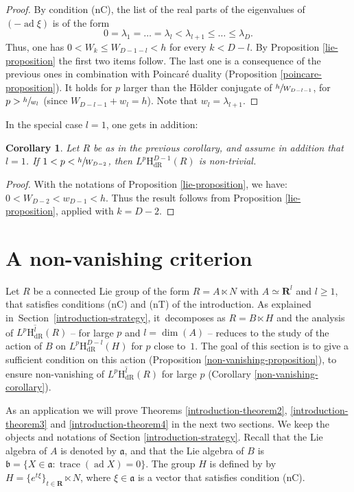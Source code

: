 \documentclass[JEP,XML,SOM,Unicode,published]{cedram}
\newcommand{\dR}{\mathrm{dR}}
\newcommand{\rH}{\mathrm{H}}
\newcommand{\fra}{\mathfrak{a}}
\newcommand{\frb}{\mathfrak{b}}
\newcommand{\RR}{\mathbf{R}}
\theoremstyle{plain}
\newtheorem{corollary}[equation]{Corollary}
\theoremstyle{remark}
\theoremstyle{definition}
\DeclareMathOperator{\ad}{ad}
\DeclareMathOperator{\trace}{trace}
\begin{document}
\begin{proof} By condition (nC), the list of the real parts of the eigenvalues of $(-\ad\xi)$ is of the form
\[0=\lambda_1 = \dots = \lambda_l < \lambda_{l+1} \leqslant \dots \leqslant \lambda_D.\]
Thus, one has $0< W_k \leqslant W_{D-1-l} <h$ for every $k <D-l$.
By Proposition \ref{lie-proposition} the first two items follow. The last one is a consequence of the previous ones in combination with Poincaré duality (Proposition \ref{poincare-proposition}). It holds
for $p$ larger than the Hölder conjugate of
$\sfrac{h}{W_{D-l-1}}$, \ie for $p> \sfrac{h}{w_{l}}$
(since $W_{D-l-1} + w_{l}=h$). Note that $w_l = \lambda_{l+1}$.
\end{proof}

In the special case $l=1$, one gets in addition:

\begin{corollary}
\label{lie-corollary2}
Let $R$ be as in the previous corollary, and assume in addition that $l=1$.
If $1<p < \sfrac{h}{W_{D-2}}$, then $L^p \rH^{D-1}_\dR(R)$ is non-trivial.
\end{corollary}

\begin{proof} With the notations of Proposition \ref{lie-proposition}, we have: $0< W_{D-2} <w_{D-1} <h$. Thus the result follows from Proposition \ref{lie-proposition}, applied with $k= D-2$.
\end{proof}

\section{A non-vanishing criterion}
\label{s - non-vanishing crit}

Let $R$ be a connected Lie group of the form $R = A \ltimes N$ with $A \simeq \RR^l$ and $l \geqslant 1$, that satisfies conditions (nC) and (nT) of the introduction.
As explained in~Section~\ref{introduction-strategy}, it~decomposes as $R = B \ltimes H$ and the analysis of
$L^p\overline{\rH_\dR^l}(R)$ -- for large $p$ and $l = \dim(A)$ -- reduces to the study of the action of $B$
on $L^p\rH_\dR^{D-l} (H)$ for $p$ close to~$1$. The goal of this section is to give a sufficient condition
on this action (Proposition \ref{non-vanishing-proposition}), to ensure non-vanishing of
$L^p\overline{\rH_\dR^l}(R)$ for large $p$ (Corollary \ref{non-vanishing-corollary}).

As an application we will prove Theorems \ref{introduction-theorem2}, \ref{introduction-theorem3}
and \ref{introduction-theorem4} in the next two sections.
We keep the objects and notations of Section \ref{introduction-strategy}. Recall that the Lie algebra of $A$ is denoted by
$\fra$, and that the Lie algebra of $B$ is
$\frb =\{X \in \fra: \trace(\ad X) = 0\}$. The group $H$ is defined by by $H = \{e^{t\xi}\}_{t \in \RR} \ltimes N$, where $\xi \in \fra$ is a vector that satisfies condition (nC).
\end{document}
